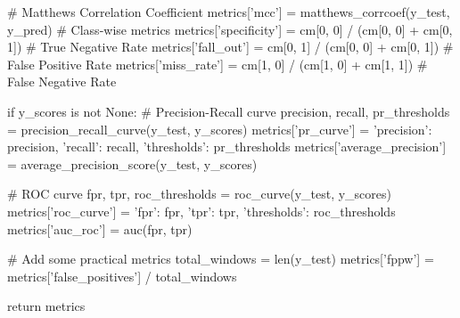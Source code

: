 \begin{pythoncode}
    # Matthews Correlation Coefficient
    metrics['mcc'] = matthews_corrcoef(y_test, y_pred)
    # Class-wise metrics
    metrics['specificity'] = cm[0, 0] / (cm[0, 0] + cm[0, 1])  # True Negative Rate
    metrics['fall_out'] = cm[0, 1] / (cm[0, 0] + cm[0, 1])  # False Positive Rate
    metrics['miss_rate'] = cm[1, 0] / (cm[1, 0] + cm[1, 1])  # False Negative Rate

    if y_scores is not None:
        # Precision-Recall curve
        precision, recall, pr_thresholds = precision_recall_curve(y_test, y_scores)
        metrics['pr_curve'] = {
            'precision': precision,
            'recall': recall,
            'thresholds': pr_thresholds
        }
        metrics['average_precision'] = average_precision_score(y_test, y_scores)

        # ROC curve
        fpr, tpr, roc_thresholds = roc_curve(y_test, y_scores)
        metrics['roc_curve'] = {
            'fpr': fpr,
            'tpr': tpr,
            'thresholds': roc_thresholds
        }
        metrics['auc_roc'] = auc(fpr, tpr)

    # Add some practical metrics
    total_windows = len(y_test)
    metrics['fppw'] = metrics['false_positives'] / total_windows

    return metrics

\end{pythoncode}

